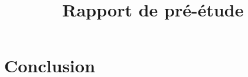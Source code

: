 \documentclass{rapport}
\title{Rapport de pré-étude}
\begin{document}
	
	
	\tableofcontents	
	
	
			
			
		
		
	
		
	
		
		
		
			
		
		
		
		
				
		
	
	
	
	\chapter*{Conclusion}
		
\end{document}
